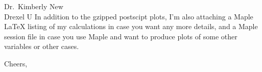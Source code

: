\begin{letter}{%
Dr.\ Kimberly New\\
Drexel U
}
    In addition to the gzipped postscipt plots, I'm also attaching a
Maple LaTeX listing of my calculations in case you want any more
details, and a Maple session file in case you use Maple and want to
produce plots of some other variables or other cases.

    \closing{%
Cheers,
    }

\end{letter}




